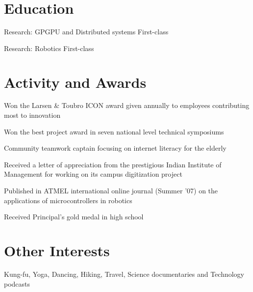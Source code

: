 \begin{minipage}[t]{0.31\textwidth}

\section{Education} 
\textbullet{} Research: GPGPU and Distributed systems
\textbullet{} First-class
\vspace{4pt}

\textbullet{} Research: Robotics
\textbullet{} First-class

\section{Activity and Awards}
\vspace{6pt}
\begin{tightitemize}
\item Won the Larsen \& Toubro ICON award given annually to employees contributing most to innovation
\item Won the best project award in seven national level technical symposiums
\item Community teamwork captain focusing on internet literacy for the elderly
\item Received a letter of appreciation from the prestigious Indian Institute of Management for working on its campus digitization project
\item Published in ATMEL international online journal (Summer ’07) on the applications of microcontrollers in robotics
\item Received Principal’s gold medal in high school
\end{tightitemize}
\section{Other Interests}
Kung-fu, Yoga, Dancing, Hiking, Travel, Science documentaries and Technology podcasts
\end{minipage} %
\vspace{-1cm}